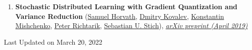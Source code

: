 \begin{enumerate}
\item \textbf{Stochastic Distributed Learning with Gradient Quantization and Variance Reduction} (\href{https://samuelhorvath.github.io}{\color{linkcolour}Samuel Horvath}, \href{https://www.dmitry-kovalev.com}{\color{linkcolour}Dmitry Kovalev}, \href{https://konstmish.github.io}{\color{linkcolour}Konstantin Mishchenko}, \href{https://richtarik.org}{\color{linkcolour}Peter Richtarik}, \href{https://sstich.ch}{\color{linkcolour}Sebastian U. Stich}), \href{https://arxiv.org/abs/1904.05115}{\em \color{black}arXiv preprint (April 2019)}
\end{enumerate}
\bigskip
\begin{center}
Last Updated on March 20, 2022
\end{center}
